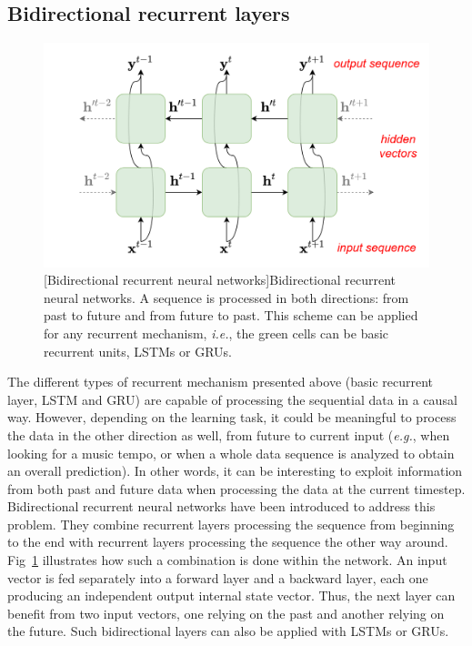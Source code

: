 \subsection{Bidirectional recurrent layers}

\begin{figure}[t]
    \begin{center}
    \includegraphics[width=1.\linewidth]{Images/chap3/bidirectionalRecurrentNeuralNetworks.png}
    [Bidirectional recurrent neural networks]{Bidirectional recurrent neural networks. A sequence is processed in both directions: from past to future and from future to past. This scheme can be applied for any recurrent mechanism, \textit{i.e.}, the green cells can be basic recurrent units, LSTMs or GRUs.}
    \label{fig:bidirectionalRecurrentNeuralNetworks}
    \end{center}
\end{figure}

The different types of recurrent mechanism presented above (basic recurrent layer, LSTM and GRU) are capable of processing the sequential data in a causal way. However, depending on the learning task, it could be meaningful to process the data in the other direction as well, from future to current input  (\emph{e.g.}, when looking for a music tempo, or when a whole data sequence is analyzed to obtain an overall prediction). In other words, it can be interesting to exploit information from both past and future data when processing the data at the current timestep. Bidirectional recurrent neural networks \cite{schuster_bidirectional_1997} have been introduced to address this problem. They combine recurrent layers processing the sequence from beginning to the end with recurrent layers processing the sequence the other way around. Fig~\ref{fig:bidirectionalRecurrentNeuralNetworks} illustrates how such a combination is done within the network. An input vector is fed separately into a forward layer and a backward layer, each one producing an independent output internal state vector. Thus, the next layer can benefit from two input vectors, one relying on the past and another relying on the future. Such bidirectional layers can also be applied with LSTMs or GRUs.

